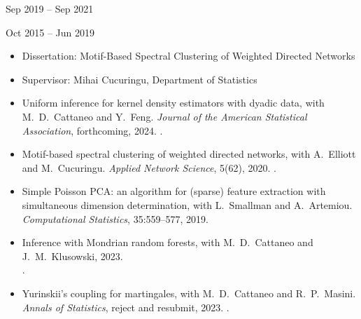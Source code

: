 \documentclass{wgu-cv}
\begin{document}
{Sep 2019 -- Sep 2021}

{Oct 2015 -- Jun 2019}

\begin{itemize}
  \item Dissertation:
    Motif-Based Spectral Clustering of Weighted Directed Networks
  \item Supervisor:
    Mihai Cucuringu,
    Department of Statistics
\end{itemize}


\begin{itemize}

  \item Uniform inference for kernel density estimators with dyadic data,
    with M.\ D.\ Cattaneo and Y.\ Feng.
    \emph{Journal of the American Statistical Association}, forthcoming, 2024.
    .

  \item Motif-based spectral clustering of weighted directed networks,
    with A.\ Elliott and M.\ Cucuringu.
    \emph{Applied Network Science}, 5(62), 2020.
    .

  \item Simple Poisson PCA: an algorithm for (sparse) feature extraction
    with simultaneous dimension determination,
    with L.\ Smallman and A.\ Artemiou.
    \emph{Computational Statistics}, 35:559--577, 2019.

\end{itemize}

\begin{itemize}

  \item Inference with Mondrian random forests,
    with M.\ D.\ Cattaneo and J.\ M.\ Klusowski, 2023. \\
    .

  \item Yurinskii's coupling for martingales,
    with M.\ D.\ Cattaneo and R.\ P.\ Masini.
    \emph{Annals of Statistics}, reject and resubmit, 2023.
    .

\end{itemize}
\end{document}
